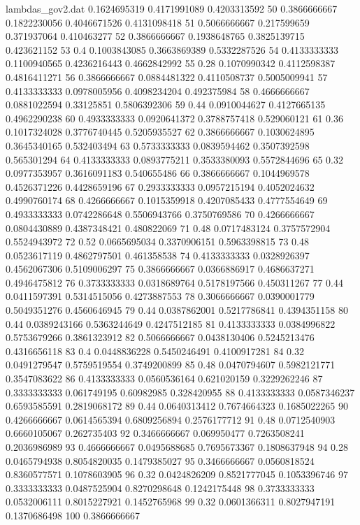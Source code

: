 \begin{filecontents*}{lambdas_gov2.dat}
0.1624695319	0.4171991089	0.4203313592	50	0.3866666667
0.1822230056	0.4046671526	0.4131098418	51	0.5066666667
0.217599659	0.371937064	0.410463277	52	0.3866666667
0.1938648765	0.3825139715	0.423621152	53	0.4
0.1003843085	0.3663869389	0.5332287526	54	0.4133333333
0.1100940565	0.4236216443	0.4662842992	55	0.28
0.1070990342	0.4112598387	0.4816411271	56	0.3866666667
0.0884481322	0.4110508737	0.5005009941	57	0.4133333333
0.0978005956	0.4098234204	0.492375984	58	0.4666666667
0.0881022594	0.33125851	0.5806392306	59	0.44
0.0910044627	0.4127665135	0.4962290238	60	0.4933333333
0.0920641372	0.3788757418	0.529060121	61	0.36
0.1017324028	0.3776740445	0.5205935527	62	0.3866666667
0.1030624895	0.3645340165	0.532403494	63	0.5733333333
0.0839594462	0.3507392598	0.565301294	64	0.4133333333
0.0893775211	0.3533380093	0.5572844696	65	0.32
0.0977353957	0.3616091183	0.540655486	66	0.3866666667
0.1044969578	0.4526371226	0.4428659196	67	0.2933333333
0.0957215194	0.4052024632	0.4990760174	68	0.4266666667
0.1015359918	0.4207085433	0.4777554649	69	0.4933333333
0.0742286648	0.5506943766	0.3750769586	70	0.4266666667
0.0804430889	0.4387348421	0.480822069	71	0.48
0.0717483124	0.3757572904	0.5524943972	72	0.52
0.0665695034	0.3370906151	0.5963398815	73	0.48
0.0523617119	0.4862797501	0.461358538	74	0.4133333333
0.0328926397	0.4562067306	0.5109006297	75	0.3866666667
0.0366886917	0.4686637271	0.4946475812	76	0.3733333333
0.0318689764	0.5178197566	0.450311267	77	0.44
0.0411597391	0.5314515056	0.4273887553	78	0.3066666667
0.0390001779	0.5049351276	0.4560646945	79	0.44
0.0387862001	0.5217786841	0.4394351158	80	0.44
0.0389243166	0.5363244649	0.4247512185	81	0.4133333333
0.0384996822	0.5753679266	0.3861323912	82	0.5066666667
0.0438130406	0.5245213476	0.4316656118	83	0.4
0.0448836228	0.5450246491	0.4100917281	84	0.32
0.0491279547	0.5759519554	0.3749200899	85	0.48
0.0470794607	0.5982121771	0.3547083622	86	0.4133333333
0.0560536164	0.621020159	0.3229262246	87	0.3333333333
0.061749195	0.60982985	0.328420955	88	0.4133333333
0.0587346237	0.6593585591	0.2819068172	89	0.44
0.0640313412	0.7674664323	0.1685022265	90	0.4266666667
0.0614565394	0.6809256894	0.2576177712	91	0.48
0.0712540903	0.6660105067	0.262735403	92	0.3466666667
0.069950477	0.7263508241	0.2036986989	93	0.4666666667
0.0495688685	0.7695673367	0.1808637948	94	0.28
0.0465794938	0.8054820035	0.1479385027	95	0.3466666667
0.0560818524	0.8360577571	0.1078603905	96	0.32
0.0424826209	0.8521777045	0.1053396746	97	0.3333333333
0.0487525904	0.8270298648	0.1242175448	98	0.3733333333
0.0532006111	0.8015227921	0.1452765968	99	0.32
0.0601366311	0.8027947191	0.1370686498	100	0.3866666667
\end{filecontents*}

